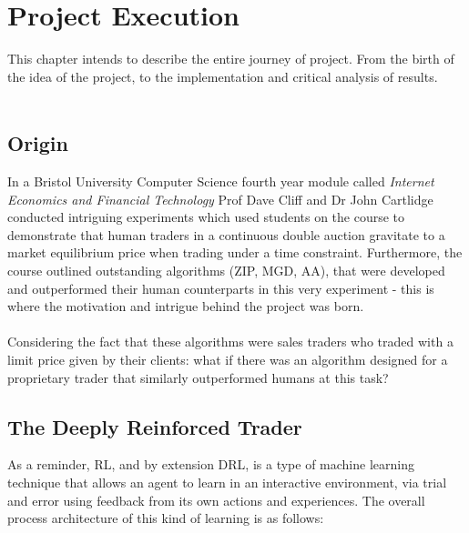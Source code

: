 \documentclass[ %
                    author={Ashwinder Khurana},
                supervisor={Prof Dave Cliff},
                    degree={MEng},
                     title={The Deeply Reinforced Trader},
                  subtitle={},
                      type={enterprise},
                      year={2020} ]{dissertation}
\begin{document}
{%

\chapter{Project Execution}
\label{chap:execution}
\vspace{1cm}

\noindent 
This chapter intends to describe the entire journey of project. From the birth of the idea of the project, to the implementation and critical analysis of results. 
{\color{red}{Talk about merging chapters 3 and 4 because the nature of project - intertwined}}
\\
\\
\section{Origin}
In a Bristol University Computer Science fourth year module called \textit{Internet Economics and Financial Technology} Prof Dave Cliff and Dr John Cartlidge conducted intriguing experiments which used students on the course to demonstrate that human traders in a continuous double auction gravitate to a market equilibrium price when trading under a time constraint. Furthermore, the course outlined outstanding algorithms (ZIP, MGD, AA), that were developed and outperformed their human counterparts in this very experiment - this is where the motivation and intrigue behind the project was born. 
\\
\\
\noindent
Considering the fact that these algorithms were sales traders who traded with a limit price given by their clients: what if there was an algorithm designed for a proprietary trader that similarly outperformed humans at this task?

\section{The Deeply Reinforced Trader}
As a reminder, RL, and by extension DRL, is a type of machine learning technique that allows an agent to learn in an interactive environment, via trial and error using feedback from its own actions and experiences. The overall process architecture of this kind of learning is as follows: 

\begin{figure}[H]
\label{fig:RL-arch}  
\end{figure}

}
\end{document}
